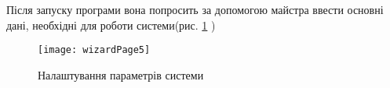 Після запуску програми вона попросить за допомогою майстра ввести основні дані,
 необхідні для роботи системи(рис. \ref{fig:wizard} )

\begin{figure}
\centering
\texttt{[image: wizardPage5]}
\caption{Налаштування параметрів системи}
\label{fig:wizard}
\end{figure} 

